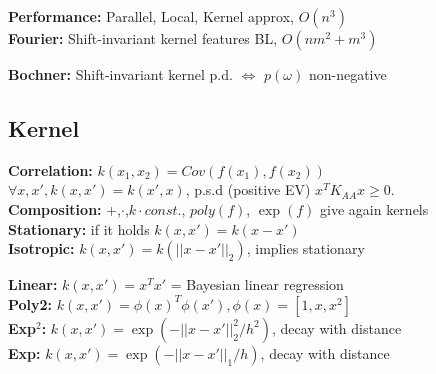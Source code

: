 \textbf{Performance:} Parallel, Local, Kernel approx, $O(n^3)$\\

\textbf{Fourier:} Shift-invariant kernel features BL, $O(nm^2 + m^3)$\\
\begin{comment}
	The Gaussian kernel is a standart normal Gaussian in the Fourier Space.\\
\end{comment} 

\textbf{Bochner:} Shift-invariant kernel p.d. $\Leftrightarrow$ $p(\omega)$ non-negative\\

\subsection{Kernel}
\textbf{Correlation:} $k(x_1, x_2) = Cov(f(x_1), f(x_2))$\\
$\forall x,x',k(x, x') = k(x', x)$, p.s.d (positive EV) $x^T K_{AA} x \geq 0$.\\
\textbf{Composition:} +,$\cdot$,$k\cdot const.$, $poly(f)$, $\exp(f)$ give again kernels\\
\textbf{Stationary:} if it holds $k(x,x') = k(x-x')$\\
\textbf{Isotropic:} $k(x,x') = k(||x-x'||_2)$, implies stationary\\
\begin{comment}
	After fitting to a sample point, the posterior is not isotropic, since the variance is decreased in the region of the sample.\\
\end{comment}

\textbf{Linear:} $k(x,x') = x^T x'$ = Bayesian linear regression\\
\textbf{Poly2:} $k(x,x') = \phi(x)^T \phi(x'), \phi(x) = [1, x, x^2]$\\
\textbf{Exp$^2$:} $k(x,x') = \exp(-||x - x'||_2^2 / h^2)$, decay with distance \\
\textbf{Exp:} $k(x,x') = \exp(-||x - x'||_1 / h)$, decay with distance \\
\begin{comment}
	\textbf{Visual smoothness:} The bigger h is, the higher is the radius of influence. This means that the functions appear much smoother.\\
\end{comment} 
